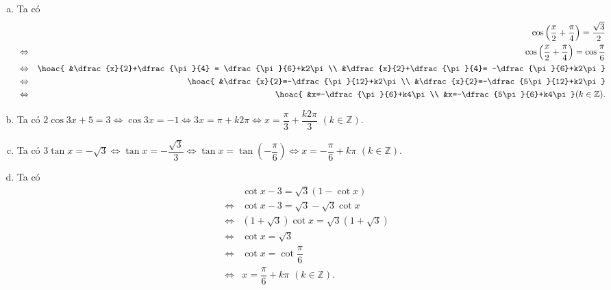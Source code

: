 \begin{ex}
{\begin{enumerate}[a)]
\begin{eqnarray*}
				      &\Leftrightarrow&
				      \hoac{&x=-\dfrac{5}{36}+\dfrac{k2\pi}{3}\\
					      &x=\dfrac{11\pi}{36}+\dfrac{k2\pi}{3}} (k\in \mathbb{Z}).
			      \end{eqnarray*}
			\item Ta có
			      \begin{eqnarray*}
				      &&\cos \left(\dfrac{x}{2}+\dfrac{\pi}{4}\right) =\dfrac{\sqrt{3}}{2} \\ &\Leftrightarrow& \cos \left(\dfrac{x}{2}+\dfrac{\pi}{4}\right)=\cos \dfrac{\pi}{6}\\
				      &\Leftrightarrow& \hoac{
					      &\dfrac{x}{2}+\dfrac{\pi}{4} = \dfrac{\pi}{6}+k2\pi\\
					      &\dfrac{x}{2}+\dfrac{\pi}{4}= -\dfrac{\pi}{6}+k2\pi}\\
				      &\Leftrightarrow&
				      \hoac{
					      &\dfrac{x}{2}=-\dfrac{\pi}{12}+k2\pi\\
					      &\dfrac{x}{2}=-\dfrac{5\pi}{12}+k2\pi}\\
				      &\Leftrightarrow&
				      \hoac{
					      &x=-\dfrac{\pi}{6}+k4\pi\\
					      &x=-\dfrac{5\pi}{6}+k4\pi} (k\in \mathbb{Z}).
			      \end{eqnarray*}
			\item Ta có $2\cos 3x+5=3 \Leftrightarrow \cos 3x =-1 \Leftrightarrow 3x=\pi+k2\pi \Leftrightarrow x = \dfrac{\pi}{3}+\dfrac{k2\pi}{3}\,\,(k\in \mathbb{Z})$.
			\item Ta có $3\tan x=-\sqrt{3} \Leftrightarrow \tan x =-\dfrac{\sqrt{3}}{3} \Leftrightarrow
				      \tan x=\tan \left(-\dfrac{\pi}{6}\right) \Leftrightarrow x=-\dfrac{\pi}{6}+k\pi\,\, (k\in \mathbb{Z}).$
			\item Ta có
			      \begin{eqnarray*}
				      &&\cot x-3=\sqrt{3}\left(1-\cot x\right)\\
				      &\Leftrightarrow& \cot x-3 =\sqrt{3}-\sqrt{3}\cot x\\
				      &\Leftrightarrow& (1+\sqrt{3})\cot x=\sqrt{3}(1+\sqrt{3})\\
				      &\Leftrightarrow& \cot x=\sqrt{3}\\
				      &\Leftrightarrow& \cot x=\cot \dfrac{\pi}{6}\\
				      &\Leftrightarrow& x=\dfrac{\pi}{6}+k\pi\,\, (k\in \mathbb{Z}).
			      \end{eqnarray*}
		\end{enumerate}
	}
\end{ex}

